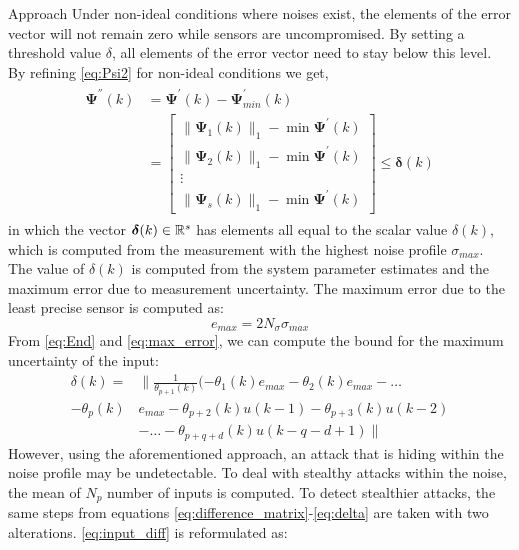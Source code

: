 \begin{section}{Approach}
Under non-ideal conditions where noises exist, the elements of the error vector will not remain zero while sensors are uncompromised. By setting a threshold value $\delta$, all elements of the error vector need to stay below this level. By refining \eqref{eq:Psi2} for non-ideal conditions we get,
    \begin{align}
    \begin{split}
    \label{eq:Psi2_nonideal}
	\bm{\Psi^{''}}(k)&=\bm{\Psi^{'}}(k)-\bm{\Psi}^{'}_{min}(k) \\
	& =\begin{bmatrix} \lVert{\bm{\Psi}_1(k)}\rVert_1 - \min \bm{\Psi}^{'}(k)\\ \lVert{\bm{\Psi}_2(k)}\rVert_1 - \min \bm{\Psi}^{'}(k) \\ \vdots \\ \lVert{\bm{\Psi}_s(k)}\rVert_1 - \min \bm{\Psi}^{'}(k) \end{bmatrix} \leq \bm{\delta}(k)
	\end{split}
	\end{align}
in which the vector $\bm{\delta}(k) \in \mathbb{R}^s$ has elements all equal to the scalar value $\delta(k)$, which is computed from the measurement with the highest noise profile $\sigma_{max}$. The value of $\delta(k)$ is computed from the system parameter estimates and the maximum error due to measurement uncertainty. The maximum error due to the least precise sensor is computed as:
	\begin{equation}
	    \label{eq:max_error}
	    e_{max} = 2N_{\sigma}\sigma_{max}
	\end{equation}
From \eqref{eq:End} and \eqref{eq:max_error}, we can compute the bound for the maximum uncertainty of the input:
\begin{align}
	\label{eq:delta}
	\delta(k)=& \lVert{ \frac{1}{\theta_{p+1}(k)}(-\theta_1(k)e_{max}-\theta_2(k)e_{max} }-\dots \nonumber \\
    -\theta_p(k)&e_{max}-\theta_{p+2}(k)u(k-1)-\theta_{p+3}(k)u(k-2)  \\
	&- \dots - \theta_{p+q+d}(k)u(k-q-d+1) \rVert  \nonumber
	\end{align}
However, using the aforementioned approach, an attack that is hiding within the noise profile may be undetectable. To deal with stealthy attacks within the noise, the mean of $N_p$ number of inputs is computed. To detect stealthier attacks, the same steps from equations \eqref{eq:difference_matrix}-\eqref{eq:delta} are taken with two alterations. \eqref{eq:input_diff} is reformulated as:
    \begin{equation}

\end{equation}
\end{section}
